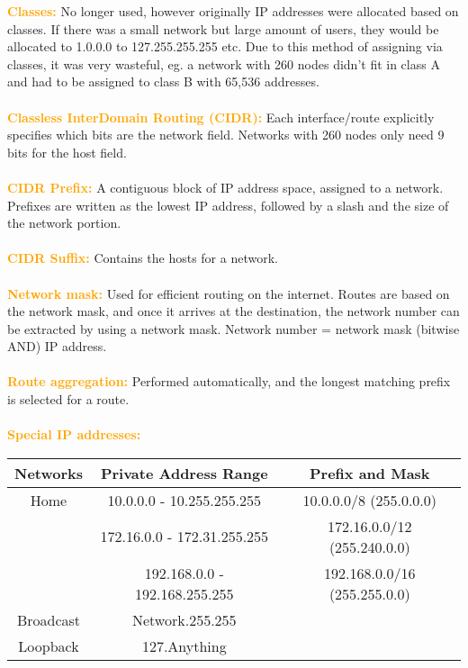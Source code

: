 \documentclass[a4paper,10pt]{article}
\begin{document}
\textcolor{Orange}{\textbf{Classes:}} No longer used, however originally IP addresses were allocated based on classes. If there was a small network but large amount of users, they would be allocated to 1.0.0.0 to 127.255.255.255 etc. Due to this method of assigning via classes, it was very wasteful, eg. a network with 260 nodes didn't fit in class A and had to be assigned to class B with 65,536 addresses. \\\\
\newpage
\noindent \textcolor{Orange}{\textbf{Classless InterDomain Routing (CIDR):}} Each interface/route explicitly specifies which bits are the network field. Networks with 260 nodes only need 9 bits for the host field. \\\\
\textcolor{Orange}{\textbf{CIDR Prefix:}} A contiguous block of IP address space, assigned to a network. Prefixes are written as the lowest IP address, followed by a slash and the size of the network portion.  \\\\
\textcolor{Orange}{\textbf{CIDR Suffix:}} Contains the hosts for a network. \\\\
\textcolor{Orange}{\textbf{Network mask:}} Used for efficient routing on the internet. Routes are based on the network mask, and once it arrives at the destination, the network number can be extracted by using a network mask. Network number = network mask (bitwise AND) IP address. \\\\
\textcolor{Orange}{\textbf{Route aggregation:}} Performed automatically, and the longest matching prefix is selected for a route. \\\\
\textcolor{Orange}{\textbf{Special IP addresses:}}
\begin{center}
	\begin{tabular}{|c|c|c|}
		\hline
	    \textbf{Networks} &\textbf{Private Address Range} &\textbf{Prefix and Mask} \\
		\hline 
		\hline 
		Home &10.0.0.0 - 10.255.255.255 &10.0.0.0/8 (255.0.0.0) \\
		\hline  
		 &172.16.0.0 - 172.31.255.255 &172.16.0.0/12 (255.240.0.0) \\
		\hline 
		 &192.168.0.0 - 192.168.255.255 &192.168.0.0/16 (255.255.0.0) \\
		\hline 
		Broadcast &Network.255.255 & \\ 
		\hline 
		Loopback &127.Anything &   \\
		\hline 
	\end{tabular}
\end{center}
\end{document}
